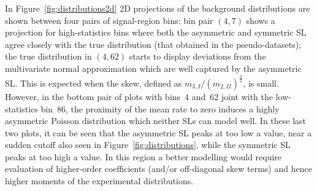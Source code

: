\documentclass[11pt]{article}
\begin{document}
In Figure~\ref{fig:distributions2d} 2D projections of the background
distributions are shown between four pairs of signal-region bins: bin pair
$(4,7)$ shows a projection for high-statistics bins where both the asymmetric and symmetric  SL agree closely with the true distribution (that obtained in the pseudo-datasets);
the true distribution in $(4,62)$ starts to display deviations from the multivariate
normal approximation which are well captured by the asymmetric SL. This is
expected when the skew, defined as $m_{3,I}/(m_{2,II})^{\frac{3}{2}}$, is small.
However, in the bottom pair of plots with bins~4 and~62 joint with the low-statistics
bin~86, the proximity of the mean rate to zero induces a highly asymmetric
Poisson distribution which neither SLs can model well. In these last
two plots, it can be seen that the asymmetric SL peaks at too low a value,
near a sudden cutoff also seen in Figure~\ref{fig:distributions}, while the
symmetric SL peaks at too high a value. 
In this region a better modelling would  require
evaluation of higher-order coefficients (and/or off-diagonal skew terms) and
hence higher moments of the experimental distributions.


\end{document}
